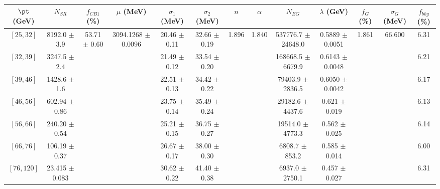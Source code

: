 \begin{tabular}{c||c|c|c|c|c|c|c|c|c|c|c||c}
$\pt$ (GeV) & $N_{SR}$ & $f_{CB1}$ (\%) & $\mu$ (MeV) & $\sigma_1$ (MeV) & $\sigma_2$ (MeV) & $n$ & $\alpha$ & $N_{BG}$ & $\lambda$ (GeV) & $f_G$ (\%) & $\sigma_G$ (MeV) & $f_{bkg}$ (\%) \\
\hline
$[25, 32]$ & 8192.0 $\pm$ 3.9 & \multirow{7}{*}{53.71 $\pm$ 0.60} & \multirow{7}{*}{3094.1268 $\pm$ 0.0096} & 20.46 $\pm$ 0.11 & 32.66 $\pm$ 0.19 & \multirow{7}{*}{1.896} & \multirow{7}{*}{1.840} & 537776.7 $\pm$ 24648.0 & 0.5889 $\pm$ 0.0051 & \multirow{7}{*}{1.861} & \multirow{7}{*}{66.600} & 6.31\\
$[32, 39]$ & 3247.5 $\pm$ 2.4 &  &  & 21.49 $\pm$ 0.12 & 33.54 $\pm$ 0.20 &  &  & 168668.5 $\pm$ 6679.9 & 0.6143 $\pm$ 0.0048 &  &  & 6.21\\
$[39, 46]$ & 1428.6 $\pm$ 1.6 &  &  & 22.51 $\pm$ 0.13 & 34.42 $\pm$ 0.22 &  &  & 79403.9 $\pm$ 2836.5 & 0.6050 $\pm$ 0.0042 &  &  & 6.17\\
$[46, 56]$ & 602.94 $\pm$ 0.86 &  &  & 23.75 $\pm$ 0.14 & 35.49 $\pm$ 0.24 &  &  & 29182.6 $\pm$ 4437.6 & 0.621 $\pm$ 0.019 &  &  & 6.13\\
$[56, 66]$ & 240.20 $\pm$ 0.54 &  &  & 25.21 $\pm$ 0.15 & 36.75 $\pm$ 0.27 &  &  & 19514.0 $\pm$ 4773.3 & 0.562 $\pm$ 0.025 &  &  & 6.14\\
$[66, 76]$ & 106.19 $\pm$ 0.37 &  &  & 26.67 $\pm$ 0.17 & 38.00 $\pm$ 0.30 &  &  & 6808.7 $\pm$ 853.2 & 0.585 $\pm$ 0.014 &  &  & 6.00\\
$[76, 120]$ & 23.415 $\pm$ 0.083 &  &  & 30.62 $\pm$ 0.22 & 41.40 $\pm$ 0.38 &  &  & 6937.0 $\pm$ 2750.1 & 0.457 $\pm$ 0.027 &  &  & 6.31\\
\end{tabular}
